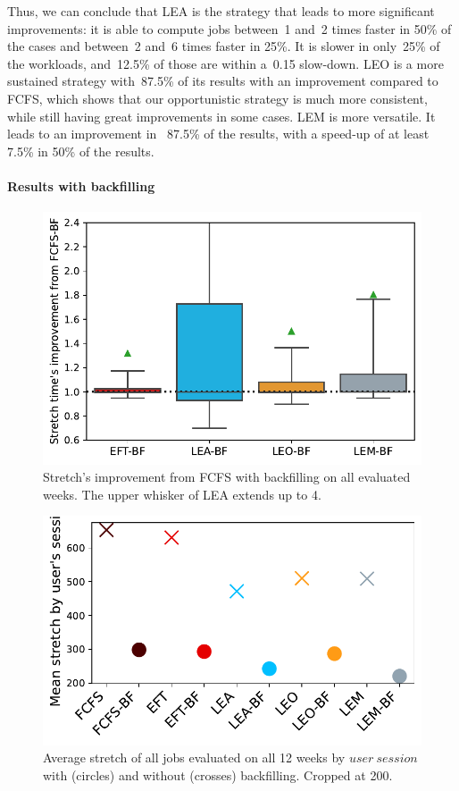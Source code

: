 \documentclass[conference]{IEEEtran}
\newcommand{\us}{\ensuremath{\mathit{user~session}}\xspace}
\begin{document}
Thus, we can conclude that LEA is the strategy that leads to more significant improvements: it is able to compute jobs between~1 and~2 times faster in 50\% of the cases and between~2 and~6 times faster in 25\%.
It is slower in only~25\% of the workloads, and~12.5\% of those are within a~0.15 slow-down.
LEO is a more sustained strategy with~87.5\% of its results with an improvement compared to FCFS, which shows that our opportunistic
strategy is much more consistent, while still having great improvements in some cases.
LEM is more versatile. It leads to an improvement in ~87.5\% of the results, with a speed-up of at least 7.5\% in 50\% of the results.

\paragraph{Results with backfilling}
\begin{figure}[t]\centering\includegraphics[width=0.9\linewidth]{../MBSS/plot/Boxplot/byuser/box_plot_bf_stretch_all-all_1.pdf}\caption{Stretch's improvement from FCFS with backfilling on all evaluated weeks. The upper whisker of LEA extends up to 4.}\label{boxplot.all_bf}\end{figure}
\begin{figure}[t]\centering\includegraphics[width=0.9\linewidth]{../MBSS/plot/byuser/Mean_stretch_with_and_without_bf_all-all.pdf}\caption{Average stretch of all jobs evaluated on all 12 weeks by \us with (circles) and without (crosses) backfilling. Cropped at 200.}\label{bf_vs_non_bf}\end{figure}
\end{document}
